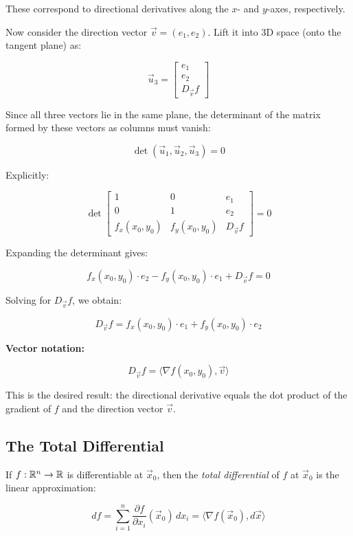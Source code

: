These correspond to directional derivatives along the \(x\)- and \(y\)-axes, respectively.

Now consider the direction vector \( \vec{v} = (e_1, e_2) \). Lift it into 3D space (onto the tangent 
plane) as:

\[
    \vec{u}_3 =
    \begin{bmatrix}
    e_1 \\
    e_2 \\
    D_{\vec{v}}f
    \end{bmatrix}
\]

Since all three vectors lie in the same plane, the determinant of the matrix formed by these vectors as 
columns must vanish:

\[
    \det(\vec{u}_1, \vec{u}_2, \vec{u}_3) = 0
\]

Explicitly:

\[
    \det
    \begin{bmatrix}
    1 & 0 & e_1 \\
    0 & 1 & e_2 \\
    f_x(x_0, y_0) & f_y(x_0, y_0) & D_{\vec{v}}f
    \end{bmatrix} = 0
\]

Expanding the determinant gives:

\[
    f_x(x_0, y_0) \cdot e_2 - f_y(x_0, y_0) \cdot e_1 + D_{\vec{v}}f = 0
\]

Solving for \( D_{\vec{v}}f \), we obtain:

\[
    D_{\vec{v}}f = f_x(x_0, y_0) \cdot e_1 + f_y(x_0, y_0) \cdot e_2
\]

\textbf{Vector notation:}

\[
    D_{\vec{v}}f = \langle \nabla f(x_0, y_0), \vec{v} \rangle
\]

This is the desired result: the directional derivative equals the dot product of the gradient of \(f\) 
and the direction vector \( \vec{v} \).

\subsection{The Total Differential}

If \( f : \mathbb{R}^n \to \mathbb{R} \) is differentiable at \( \vec{x}_0 \), then the 
\emph{total differential} of \(f\) at \( \vec{x}_0 \) is the linear approximation:

\[
    df = \sum_{i=1}^n \frac{\partial f}{\partial x_i}(\vec{x}_0) \, dx_i = \langle \nabla f(\vec{x}_0), 
    d\vec{x} \rangle
\]


